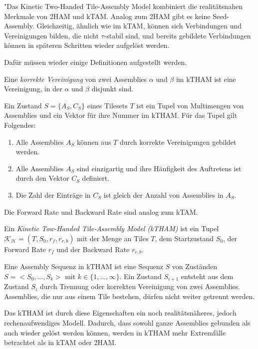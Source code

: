 "Das Kinetic Two-Handed Tile-Assembly Model kombiniert die realitätsnahen Merkmale von 2HAM und kTAM. Analog zum 2HAM gibt es keine Seed-Assembly. Gleichzeitig, ähnlich wie im kTAM, können sich Verbindungen und Vereinigungen bilden, die nicht $\tau$-stabil sind, und bereits gebildete Verbindungen können in späteren Schritten wieder aufgelöst werden.

Dafür müssen wieder einige Definitionen aufgestellt werden.

\begin{definition}
	Eine \emph{korrekte Vereinigung} von zwei Assemblies $\alpha$ und $\beta$ im kTHAM ist eine Vereinigung, in der $\alpha$ und $\beta$ disjunkt sind.
\end{definition}

\begin{definition}
	Ein Zustand $S=\{A_S,C_S\}$ eines Tilesets $T$ ist ein Tupel von Multimengen von Assemblies und ein Vektor für ihre Nummer im kTHAM. Für das Tupel gilt Folgendes:
	\begin{enumerate}
		\item Alle Assemblies $A_S$ können aus $T$ durch korrekte Vereinigungen gebildet werden.
		\item Alle Assemblies $A_S$ sind einzigartig und ihre Häufigkeit des Auftretens ist durch den Vektor $C_S$ definiert.
		\item Die Zahl der Einträge in $C_S$ ist gleich der Anzahl von Assemblies in $A_S$.
	\end{enumerate}
\end{definition}

Die Forward Rate und Backward Rate sind analog zum kTAM.

\begin{definition}
	Ein \emph{Kinetic Tow-Handed Tile-Assembly Model (kTHAM)} ist ein Tupel $\mathcal{K_H} = (T,S_0,r_f,r_{r,b})$ mit der Menge an Tiles $T$, dem Startzustand $S_0$, der Forward Rate $r_f$ und der Backward Rate $r_{r,b}$.
\end{definition}
\begin{definition}
	Eine Assembly Sequenz in kTHAM ist eine Sequenz $S$ von Zuständen $S=<S_0,\dots,S_k>$ mit $k\in\{1,\dots,\infty\}$. Ein Zustand $S_{i+1}$ entsteht aus dem Zustand $S_i$ durch Trennung oder korrekten Vereinigung von zwei Assemblies. Assemblies, die nur aus einem Tile bestehen, dürfen nicht weiter getrennt werden.
\end{definition}

Das kTHAM ist durch diese Eigenschaften ein noch realitätsnäheres, jedoch rechenaufwendiges Modell. Dadurch, dass sowohl ganze Assemblies gebunden als auch wieder gelöst werden können, werden in kTHAM mehr Extremfälle betrachtet als in kTAM oder 2HAM.

